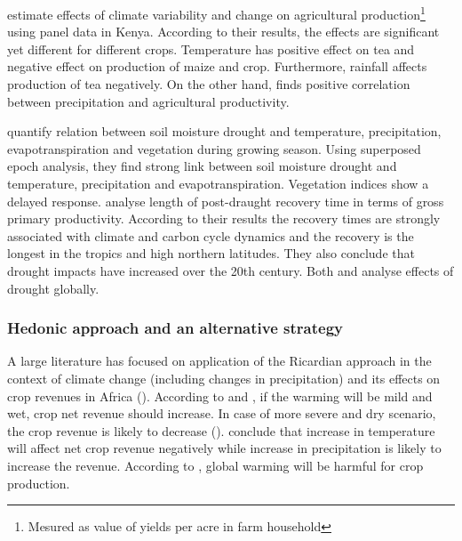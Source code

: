 \documentclass[a4paper,12pt]{article}
\begin{document}
\cite{Ochieng2016} estimate effects of climate variability and change on agricultural production\footnote{Mesured as value of yields per acre in farm household} using panel data in Kenya. According to their results, the effects are significant yet different for different crops. Temperature has positive effect on tea and negative effect on production of maize and crop. Furthermore, rainfall affects production of tea negatively. On the other hand, \cite{Vrieling2011} finds positive correlation between precipitation and agricultural productivity.








 \cite{nicolai2017} quantify relation between soil moisture drought and temperature, precipitation, evapotranspiration and vegetation during growing season. Using superposed epoch analysis, they find strong link between soil moisture drought and temperature, precipitation and evapotranspiration. Vegetation indices show a delayed response. \cite{schwalm2017} analyse length of post-draught recovery time in terms of gross primary productivity. According to their results the recovery times are strongly associated with climate and carbon cycle dynamics and the recovery is the longest in the tropics and high northern latitudes. They also conclude that drought impacts have increased over the 20th century. Both \cite{nicolai2017} and \cite{schwalm2017} analyse effects of drought globally.
 

\subsubsection*{Hedonic approach and an alternative strategy}

A large literature has focused on application of the Ricardian approach in the context of climate change (including changes in precipitation) and its effects on crop revenues in Africa (\citealp{RicardianBello,kabubo2007, KMendelsohn2008, SeoMendelsohn}). According to \cite{SeoMendelsohn} and \cite{KMendelsohn2008}, if the warming will be mild and wet, crop net revenue should increase. In case of more severe and dry scenario, the crop revenue is likely to decrease (\citealp{KMendelsohn2008, SeoMendelsohn}).  \cite{RicardianBello} conclude that increase in temperature will affect net crop revenue negatively while increase in precipitation is likely to increase the revenue. According to \citet{kabubo2007}, global warming will be harmful for crop production.
\end{document}
